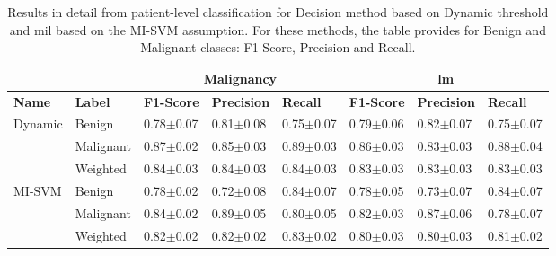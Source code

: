 \documentclass[journal,article,submit,moreauthors,pdftex, applsci]{Definitions/mdpi}
\begin{document}
\par
\begin{table}[H]
    \centering
    \begin{tabular}{lllll||lll}
                                &                   & \multicolumn{3}{c}{\textbf{Malignancy}}                               & \multicolumn{3}{c}{\textbf{\ac{lm}}}                                  \\ \hline
    \textbf{Name}               & \textbf{Label}    & \textbf{F1-Score}     & \textbf{Precision}    & \textbf{Recall}       & \textbf{F1-Score}     & \textbf{Precision}    & \textbf{Recall}       \\ \hline
    \multirow{3}{*}{Dynamic}    & Benign            & 0.78$\pm$0.07         & 0.81$\pm$0.08         & 0.75$\pm$0.07         & 0.79$\pm$0.06         & 0.82$\pm$0.07         & 0.75$\pm$0.07         \\ \cline{2-8}  
                                & Malignant         & 0.87$\pm$0.02         & 0.85$\pm$0.03         & 0.89$\pm$0.03         & 0.86$\pm$0.03         & 0.83$\pm$0.03         & 0.88$\pm$0.04         \\ \cline{2-8} 
                                & Weighted          & 0.84$\pm$0.03         & 0.84$\pm$0.03         & 0.84$\pm$0.03         & 0.83$\pm$0.03         & 0.83$\pm$0.03         & 0.83$\pm$0.03         \\ \hline
    \multirow{3}{*}{MI-SVM}     & Benign            & 0.78$\pm$0.02         & 0.72$\pm$0.08         & 0.84$\pm$0.07         & 0.78$\pm$0.05         & 0.73$\pm$0.07         & 0.84$\pm$0.07         \\ \cline{2-8}
                                & Malignant         & 0.84$\pm$0.02         & 0.89$\pm$0.05         & 0.80$\pm$0.05         & 0.82$\pm$0.03         & 0.87$\pm$0.06         & 0.78$\pm$0.07         \\ \cline{2-8} 
                                & Weighted          & 0.82$\pm$0.02         & 0.82$\pm$0.02         & 0.83$\pm$0.02         & 0.80$\pm$0.03         & 0.80$\pm$0.03         & 0.81$\pm$0.02         \\ \hline 
    \end{tabular}    
    \caption{Results in detail from patient-level classification for Decision method based on Dynamic threshold and \ac{mil} based on the MI-SVM assumption. For these methods, the table provides for Benign and Malignant classes: F1-Score, Precision and Recall.}
    \label{tab:patient_results_details}
\end{table}\par
\end{document}
